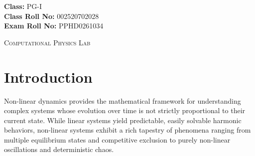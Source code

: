 \documentclass[12pt, a4paper, twoside]{article}
\begin{document}
\begin{titlepage}
        \textbf{Class:} PG-I\\
        \textbf{Class Roll No:} 002520702028\\
        \textbf{Exam Roll No:} PPHD0261034
        \vspace{1.5cm}

        \textsc{Computational Physics Lab}

        \vspace*{\fill}


    \end{titlepage}
    \thispagestyle{empty}

    \begin{abstract}
        This report computationally investigates the phase space dynamics of six distinct non-linear systems to explore phenomena ranging from competitive exclusion to deterministic chaos. A custom 5th-order Runge-Kutta (RK5) numerical solver was implemented in Fortran 90 to integrate the governing coupled differential equations, with Gnuplot utilized for high-fidelity phase portrait and vector field visualizations. The analyzed models span a wide topological spectrum, including the simple pendulum, asymmetric and symmetric Lotka-Volterra competition models (Rabbit-Sheep and Bacterial Colony), a pure quartic oscillator, a mixed saddle-centre topology, and the chaotic Lorenz system. The study highlights the profound influence of phase space geometry on system evolution, visualizing how separatrices govern survival in symmetric competition, how periods become heavily amplitude-dependent in purely non-linear potentials, and how strange attractors emerge from deterministic equations. Furthermore, the application of a uniform RK5 solver exposes critical computational nuances, underscoring the necessity of boundary conditions for unbounded, escaping trajectories and demonstrating the inherent limitations of non-symplectic integrators when modeling strictly conservative systems.
    \end{abstract}
    
    \thispagestyle{empty}
    \newpage

  	\tableofcontents
	\thispagestyle{empty}
	
	\clearpage
    \section{Introduction}
        Non-linear dynamics provides the mathematical framework for understanding complex systems whose evolution over time is not strictly proportional to their current state. While linear systems yield predictable, easily solvable harmonic behaviors, non-linear systems exhibit a rich tapestry of phenomena ranging from multiple equilibrium states and competitive exclusion to purely non-linear oscillations and deterministic chaos.
\end{document}
